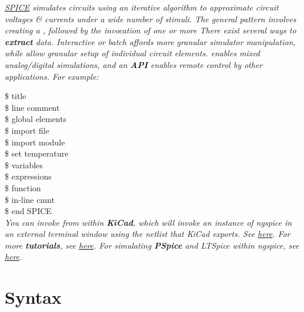 \textit{\href{http://ngspice.sourceforge.net/docs/ngspice-manual.pdf}{SPICE} simulates circuits using an iterative algorithm to approximate circuit voltages \& currents under a wide number of stimuli. The general pattern involves creating a , followed by the invocation of one or more  There exist several ways to \textbf{extract} data. Interactive or batch  affords more granular simulator manipulation, while  allow granular setup of individual circuit elements.  enables mixed analog/digital simulations, and an \textbf{API} enables remote control by other applications. For example:}

 \$ title \\
 \$ line comment \\
 \$ global elements \\
 \$ import file \\
 \$ import module \\
 \$ set temperature \\
 \$ variables \\
 \$ expressions \\
 \$ function \\
 \$ in-line cmnt \\
 \$ end SPICE \\

\textit{You can invoke from within \textbf{KiCad}, which will invoke an instance of ngspice in an external terminal window using the netlist that KiCad exports. See \href{http://ngspice.sourceforge.net/ngspice-eeschema.html\#external}{here}. For more \textbf{tutorials}, see \href{http://ngspice.sourceforge.net/tutorials.html}{here}. For simulating \textbf{PSpice} and LTSpice within ngspice, see \href{https://forum.kicad.info/t/simulations-pspice-ngspice-and-ltspice/15230/6}{here}.}
\section{Syntax}


